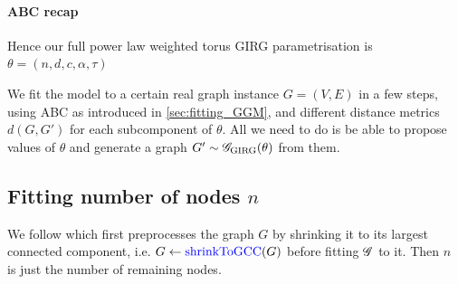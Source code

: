 



\paragraph{ABC recap}
Hence our full power law weighted torus GIRG parametrisation is $\theta = (n, d, c, \alpha, \tau)$

We fit the model to a certain real graph instance $G = (V,E)$ in a few steps, using ABC as introduced in \cref{sec:fitting_GGM}, and different distance metrics $d(G, G')$ for each subcomponent of $\theta$. All we need to do is be able to propose values of $\theta$ and generate a graph $G' \sim \mathscr{G}_{\mathrm{GIRG}}(\theta)$ from them.



\subsection{Fitting number of nodes $n$}

We follow \cite{blasius2018towards} which first preprocesses the graph $G$ by shrinking it to its largest connected component, i.e. $G \gets \operatorname{\textcolor{blue}{shrinkToGCC}}(G)$
before fitting $\mathscr{G}$ to it. Then $n$ is just the number of remaining nodes.



